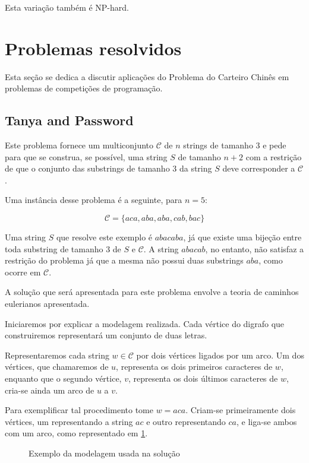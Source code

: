 \documentclass[12pt, a4paper]{article}
\begin{document}
    Esta variação também é NP-hard.


    \section{Problemas resolvidos}

        Esta seção se dedica a discutir aplicações do Problema do Carteiro Chinês em problemas de competições de programação.

        \subsection{Tanya and Password\cite{tanya}}

        Este problema fornece um multiconjunto $\mathcal{C}$ de $n$ strings de tamanho 3 e pede para que se construa, se possível, uma string $S$ de tamanho $n+2$ com a restrição de que o conjunto das substrings de tamanho 3 da string $S$ deve corresponder a $\mathcal{C}$.

        Uma instância desse problema é a seguinte, para $n=5$:

        \[\mathcal{C} = \{aca, aba, aba, cab, bac\}\]

        Uma string $S$ que resolve este exemplo é $abacaba$, já que existe uma bijeção entre toda substring de tamanho 3 de $S$ e $\mathcal{C}$.
        A string $abacab$, no entanto, não satisfaz a restrição do problema já que a mesma não possui duas substrings $aba$, como ocorre em $\mathcal{C}$.

        A solução que será apresentada para este problema envolve a teoria de caminhos eulerianos apresentada.

        Iniciaremos por explicar a modelagem realizada. Cada vértice do digrafo que construiremos representará um conjunto de duas letras. 
        
        Representaremos cada string $w \in \mathcal{C}$ por dois vértices ligados por um arco. Um dos vértices, que chamaremos de $u$, representa os dois primeiros caracteres de $w$, enquanto que o segundo vértice, $v$, representa os dois últimos caracteres de $w$, cria-se ainda um arco de $u$ a $v$.

        Para exemplificar tal procedimento tome $w = aca$. Criam-se primeiramente dois vértices, um representando a string $ac$ e outro representando $ca$, e liga-se ambos com um arco, como representado em \ref{fig:tanya}.

        \begin{figure}[H]
            \centering

            \caption{Exemplo da modelagem usada na solução}
            \label{fig:tanya}
        \end{figure}
\end{document}
